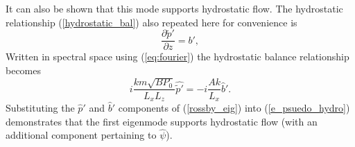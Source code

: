 \documentclass[times]{qjrms4}
\begin{document}
It can also be shown that this mode supports hydrostatic flow.
The hydrostatic relationship (\ref{hydrostatic_bal}) also repeated here for convenience is
  \begin{equation}
    \frac {\partial \tilde{p}'}{\partial z} = b', \label{e_hyrdo_bal_rossby}
  \end{equation}
Written in spectral space using (\ref{eq:fourier}) the hydrostatic balance relationship becomes
 \begin{equation} \label{e_psuedo_hydro} 
   i \frac {k m \sqrt{BP_0}} {L_x L_z} \widehat{\tilde{p}'} = -i \frac{Ak}{L_x} \widehat {b}' .
 \end{equation}
Substituting the $\widehat{p}'$ and $\widehat{b}'$ components of (\ref{rossby_eig}) into 
(\ref{e_psuedo_hydro}) demonstrates that the first eigenmode supports hydrostatic flow 
(with an additional component pertaining to $\widehat \psi$).  




\end{document}
